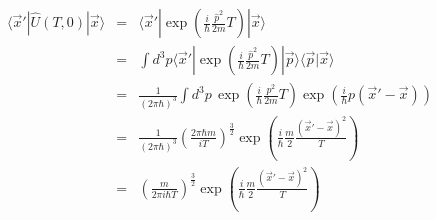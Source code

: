 \documentclass[11pt,a4paper]{article}
\begin{document}
\begin{eqnarray*}
\langle\vec{x}'|\hat{U}(T,0)|\vec{x}\rangle & = &  \langle\vec{x}'|\exp\left(\frac{i}{\hbar}\frac{\hat{p}^2}{2m}T\right) |\vec{x}\rangle \\ & = & \int d^3p \langle\vec{x}'|\exp\left(\frac{i}{\hbar}\frac{\hat{p}^2}{2m}T\right)|\vec{p}\rangle \langle\vec{p}|\vec{x}\rangle \\ & = & \frac{1}{(2\pi\hbar)^3} \int \! d^3p \, \exp\left(\frac{i}{\hbar}\frac{p^2}{2m}T\right) \exp\left(\frac{i}{\hbar}p(\vec{x}'-\vec{x})\right) \\ & = & \frac{1}{(2\pi\hbar)^3}\left(\frac{2\pi\hbar m}{iT}\right)^\frac{3}{2} \exp\left(\frac{i}{\hbar}\frac{m}{2}\frac{(\vec{x}' - \vec{x})^2}{T}\right)\\
& = & \left( \frac{m}{2\pi i\hbar T}\right)^{\frac{3}{2}} \exp\left(\frac{i}{\hbar}\frac{m}{2}\frac{(\vec{x}' - \vec{x})^2}{T}\right)
\end{eqnarray*}
\end{document}

